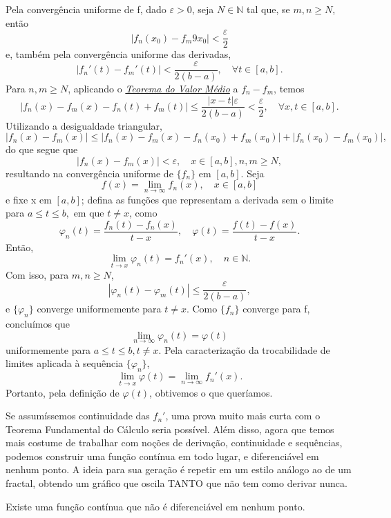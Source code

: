\documentclass[../analysis_notes.tex]{subfiles}
\begin{document}
\begin{proof*}
	Pela convergência uniforme de f, dado \(\varepsilon >0\), seja \(N\in \mathbb{N}\) tal que, se \(m, n\geq N\), então
	\[
		|f_{n}(x_{0})-f_{m}9x_{0}| < \frac{\varepsilon }{2}
	\]
	e, também pela convergência uniforme das derivadas,
	\[
		|f_{n}'(t)-f_{m}'(t)|<\frac{\varepsilon }{2(b-a)},\quad \forall t\in [a, b].
	\]
	Para \(n, m\geq N\), aplicando o \hyperlink{mean-value}{\textit{Teorema do Valor Médio}} a \(f_{n}-f_{m}\), temos
	\[
		|f_{n}(x)-f_{m}(x)-f_{n}(t)+f_{m}(t)|\leq \frac{|x-t|\varepsilon }{2(b-a)}<\frac{\varepsilon }{2},\quad \forall x, t\in[a, b].
	\]
	Utilizando a desigualdade triangular,
	\[
		|f_{n}(x)-f_{m}(x)|\leq |f_{n}(x)-f_{m}(x)-f_{n}(x_{0})+f_{m}(x_{0})|+|f_{n}(x_{0})-f_{m}(x_{0})|,
	\]
	do que segue que
	\[
		|f_{n}(x)-f_{m}(x)|<\varepsilon ,\quad x\in [a, b], n, m\geq N,
	\]
	resultando na convergência uniforme de \(\{f_{n}\}\) em \([a, b]\). Seja
	\[
		f(x)=\lim_{n\to \infty}f_{n}(x),\quad x\in [a, b]
	\]
	e fixe x em \([a, b]\); defina as funções que representam a derivada sem o limite para \(a\leq t\leq b,\) em que \(t\neq x\), como
	\[
		\varphi_{n}(t)=\frac{f_{n}(t)-f_{n}(x)}{t-x},\quad \varphi (t)=\frac{f(t)-f(x)}{t-x}.
	\]
	Então,
	\[
		\lim_{t\to x}\varphi_{n}(t)=f_{n}'(x),\quad n\in \mathbb{N}.
	\]
	Com isso, para \(m, n\geq N\),
	\[
		|\varphi_{n}(t)-\varphi_{m}(t)|\leq \frac{\varepsilon }{2(b-a)},
	\]
	e \(\{\varphi_{n}\}\) converge uniformemente para \(t\neq x\). Como \(\{f_{n}\}\) converge para f, concluímos que
	\[
		\lim_{n\to \infty}\varphi_{n}(t)=\varphi (t)
	\]
	uniformemente para \(a\leq t\leq b, t\neq x\). Pela caracterização da trocabilidade de limites aplicada à sequência \(\{\varphi_{n}\}\),
	\[
		\lim_{t\to x}\varphi (t)=\lim_{n\to \infty}f_{n}'(x).
	\]
	Portanto, pela definição de \(\varphi (t)\), obtivemos o que queríamos. \qedsymbol
\end{proof*}
Se assumíssemos continuidade das \(f_{n}'\), uma prova muito mais curta com o Teorema Fundamental do Cálculo seria possível. Além disso, agora que temos mais costume de trabalhar com noções de derivação, continuidade e sequências, podemos construir uma função contínua em todo lugar, e diferenciável em nenhum ponto. A ideia para sua geração é repetir em um estilo análogo ao de um fractal, obtendo um gráfico que oscila TANTO que não tem como derivar nunca.
\begin{theorem*}
	Existe uma função contínua que não é diferenciável em nenhum ponto.
\end{theorem*}
\end{document}
